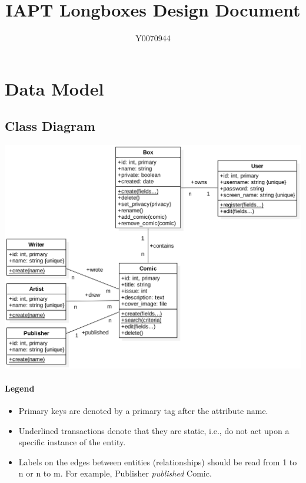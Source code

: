 \documentclass[fontsize=12pt,a4paper]{scrreprt}
\author{Y0070944}
\title{IAPT Longboxes Design Document}
\begin{document}
\maketitle
\setcounter{page}{1}

\chapter{Data Model}

\section{Class Diagram}

\includegraphics[width=\textwidth]{uml.png}

\subsubsection{Legend}
\begin{itemize}[itemsep=-0.5em]
  \item Primary keys are denoted by a \textsf{primary} tag after the attribute name.

  \item Underlined transactions denote that they are static, i.e., do not act upon a specific instance of the entity.

  \item Labels on the edges between entities (relationships) should be read from \textsf{1 to n} or \textsf{n to m}. For example, \textsf{Publisher \emph{published} Comic}.
\end{itemize}
\end{document}

